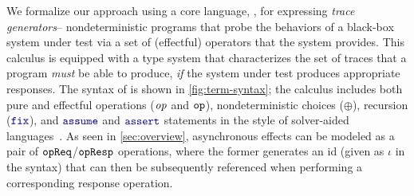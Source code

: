 We formalize our approach using a core language, \DSL{}, for
expressing \textit{trace generators}-- nondeterministic programs that
probe the behaviors of a black-box system under test via a set of
(effectful) operators that the system provides. This calculus is
equipped with a type system that characterizes the set of traces that
a program \emph{must} be able to produce, \emph{if} the system under
test produces appropriate responses. The syntax of \DSL{} is shown in
\autoref{fig:term-syntax}; the calculus includes both pure and
effectful operations ($\mathit{op}$ and $\boldsymbol{{\tt op}}$), nondeterministic
choices ($\oplus$), recursion ($\mykw{fix}$), and $\mykw{assume}$ and
$\mykw{assert}$ statements in the style of solver-aided
languages~\cite{BC+10}. As seen in \autoref{sec:overview},
asynchronous effects can be modeled as a pair of $\boldsymbol{{\tt opReq}}$/$\boldsymbol{{\tt opResp}}$ operations, where the former generates an id (given as
$\iota$ in the syntax) that can then be subsequently referenced when
performing a corresponding response operation.

